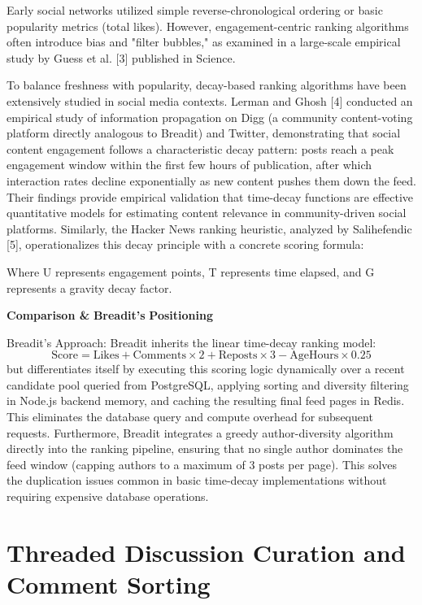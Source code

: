 Early social networks utilized simple reverse-chronological ordering or basic popularity metrics (total likes). However, engagement-centric ranking algorithms often introduce bias and "filter bubbles," as examined in a large-scale empirical study by Guess et al. [3] published in Science.

To balance freshness with popularity, decay-based ranking algorithms have been extensively studied in social media contexts. Lerman and Ghosh [4] conducted an empirical study of information propagation on Digg (a community content-voting platform directly analogous to Breadit) and Twitter, demonstrating that social content engagement follows a characteristic decay pattern: posts reach a peak engagement window within the first few hours of publication, after which interaction rates decline exponentially as new content pushes them down the feed. Their findings provide empirical validation that time-decay functions are effective quantitative models for estimating content relevance in community-driven social platforms. Similarly, the Hacker News ranking heuristic, analyzed by Salihefendic [5], operationalizes this decay principle with a concrete scoring formula:

Where U represents engagement points, T represents time elapsed, and G represents a gravity decay factor.

\textbf{Comparison \& }\textbf{Breadit's}\textbf{ Positioning}

Breadit's Approach: Breadit inherits the linear time-decay ranking model:
\[
  \text{Score} = \text{Likes} + \text{Comments} \times 2 + \text{Reposts} \times 3 - \text{AgeHours} \times 0.25
\]
but differentiates itself by executing this scoring logic dynamically over a recent candidate pool queried from PostgreSQL, applying sorting and diversity filtering in Node.js backend memory, and caching the resulting final feed pages in Redis. This eliminates the database query and compute overhead for subsequent requests. Furthermore, Breadit integrates a greedy author-diversity algorithm directly into the ranking pipeline, ensuring that no single author dominates the feed window (capping authors to a maximum of 3 posts per page). This solves the duplication issues common in basic time-decay implementations without requiring expensive database operations.

\section{Threaded Discussion Curation and Comment Sorting}

